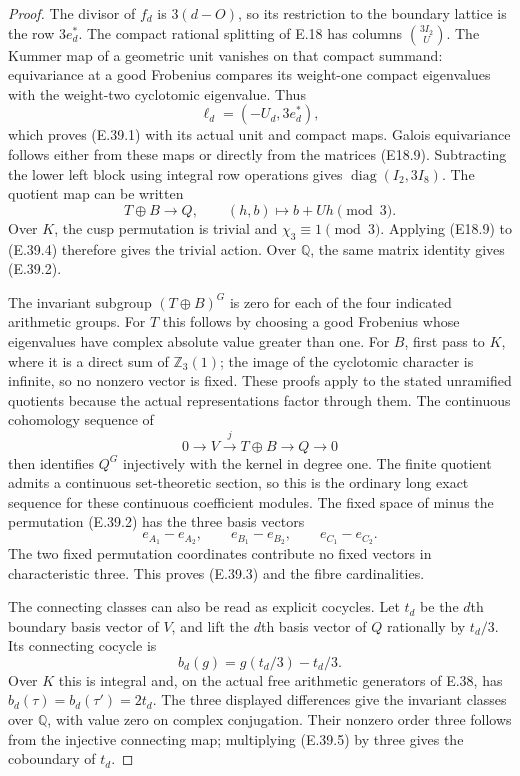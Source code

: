 \documentclass[11pt,oneside]{article}
\begin{document}
\begin{proof}
The divisor of $f_d$ is $3(d-O)$, so its restriction to
the boundary lattice is the row $3e_d^*$. The compact
rational splitting of E.18 has columns $\binom{3I_2}{U}$.
The Kummer map of a geometric unit vanishes on that
compact summand: equivariance at a good Frobenius compares
its weight-one compact eigenvalues with the weight-two
cyclotomic eigenvalue. Thus
\[
 \ell_d=(-U_d,3e_d^*),
\]
which proves (E.39.1) with its actual unit and compact
maps. Galois equivariance follows either from these maps
or directly from the matrices (E18.9). Subtracting the
lower left block using integral row operations gives
$\operatorname{diag}(I_2,3I_8)$. The quotient map can be
written
\[
 T\oplus B\longrightarrow Q,\qquad
 (h,b)\longmapsto b+Uh\pmod3.
 \tag{E.39.4}
\]
Over $K$, the cusp permutation is trivial and
$\chi_3\equiv1\pmod3$. Applying (E18.9) to (E.39.4)
therefore gives the trivial action. Over $\mathbb Q$,
the same matrix identity gives (E.39.2).

The invariant subgroup $(T\oplus B)^G$ is zero for each
of the four indicated arithmetic groups. For $T$ this
follows by choosing a good Frobenius whose eigenvalues
have complex absolute value greater than one. For $B$,
first pass to $K$, where it is a direct sum of
$\mathbb Z_3(1)$; the image of the cyclotomic character
is infinite, so no nonzero vector is fixed. These proofs
apply to the stated unramified quotients because the
actual representations factor through them.
The continuous cohomology sequence of
\[
 0\longrightarrow V\xrightarrow{j}T\oplus B
       \longrightarrow Q\longrightarrow0
\]
then identifies $Q^G$ injectively with the kernel in
degree one. The finite quotient admits a continuous
set-theoretic section, so this is the ordinary long exact
sequence for these continuous coefficient modules.
The fixed space of minus the permutation (E.39.2) has
the three basis vectors
\[
 e_{A_1}-e_{A_2},\qquad e_{B_1}-e_{B_2},\qquad
 e_{C_1}-e_{C_2}.
\]
The two fixed permutation coordinates contribute no
fixed vectors in characteristic three. This proves
(E.39.3) and the fibre cardinalities.

The connecting classes can also be read as explicit
cocycles. Let $t_d$ be the $d$th boundary basis vector
of $V$, and lift the $d$th basis vector of $Q$ rationally
by $t_d/3$. Its connecting cocycle is
\[
 b_d(g)=g(t_d/3)-t_d/3.
 \tag{E.39.5}
\]
Over $K$ this is integral and, on the actual free
arithmetic generators of E.38, has
$b_d(\tau)=b_d(\tau')=2t_d$. The three displayed
differences give the invariant classes over
$\mathbb Q$, with value zero on complex conjugation.
Their nonzero order three follows from the injective
connecting map; multiplying (E.39.5) by three gives
the coboundary of $t_d$.


\end{proof}
\end{document}
